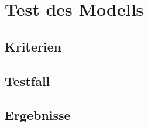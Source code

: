 \section{Test des Modells}
\label{sec:Test}
\subsection{Kriterien}
\subsection{Testfall}
\subsection{Ergebnisse}